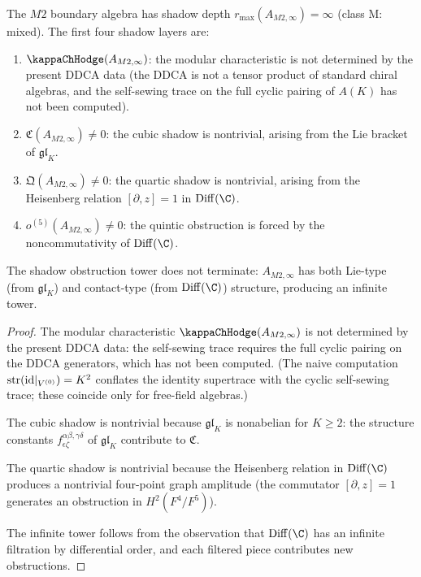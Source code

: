 \begin{proposition}
The $M2$ boundary algebra has shadow depth $r_{\max}(A_{M2,\infty}) = \infty$
(class M: mixed). The first four shadow layers are:
\begin{enumerate}[label=\textup{(\roman*)}]
\item $\kappaChHodge(A_{M2,\infty})$: the modular characteristic is
 not determined by the present DDCA data (the DDCA is not a tensor
 product of standard chiral algebras, and the self-sewing trace on the
 full cyclic pairing of $A(K)$ has not been computed).
\item $\mathfrak{C}(A_{M2,\infty}) \ne 0$: the cubic shadow is
 nontrivial, arising from the Lie bracket of $\mathfrak{gl}_K$.
\item $\mathfrak{Q}(A_{M2,\infty}) \ne 0$: the quartic shadow is
 nontrivial, arising from the Heisenberg relation
 $[\partial, z] = 1$ in $\Diff(\C)$.
\item $o^{(5)}(A_{M2,\infty}) \ne 0$: the quintic obstruction is
 forced by the noncommutativity of $\Diff(\C)$.
\end{enumerate}
The shadow obstruction tower does not terminate: $A_{M2,\infty}$ has both
Lie-type (from $\mathfrak{gl}_K$) and contact-type (from $\Diff(\C)$)
structure, producing an infinite tower.
\end{proposition}

\begin{proof}
The modular characteristic $\kappaChHodge(A_{M2,\infty})$ is not determined
by the present DDCA data:
the self-sewing trace requires the full cyclic pairing
on the DDCA generators, which has not been computed.
(The naive computation $\operatorname{str}(\mathrm{id}|_{V^{(0)}}) = K^2$
conflates the identity supertrace with the cyclic self-sewing
trace; these coincide only for free-field algebras.)

The cubic shadow is nontrivial because $\mathfrak{gl}_K$ is nonabelian
for $K \ge 2$: the structure constants $f^{\alpha\beta,\gamma\delta}_{
\epsilon\zeta}$ of $\mathfrak{gl}_K$ contribute to $\mathfrak{C}$.

The quartic shadow is nontrivial because the Heisenberg relation in
$\Diff(\C)$ produces a nontrivial four-point graph amplitude (the
commutator $[\partial, z] = 1$ generates an obstruction in
$H^2(F^4/F^5)$).

The infinite tower follows from the observation that $\Diff(\C)$ has
an infinite filtration by differential order, and each filtered piece
contributes new obstructions.
\end{proof}



